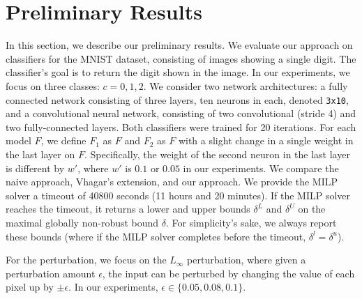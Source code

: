 
\section{Preliminary Results}
In this section, we describe our preliminary results.
We evaluate our approach on classifiers for the MNIST dataset, consisting of images showing a single digit.
The classifier's goal is to return the digit shown in the image. In our experiments, we focus on three classes: $c=0,1,2$.
We consider two network architectures: 
a fully connected network consisting of three layers, ten neurons in each, denoted \texttt{3x10}, and a convolutional neural network, 
consisting of two convolutional (stride 4) and two fully-connected layers. Both classifiers were trained for 20 iterations.
For each model $F$, we define $F_1$ as $F$ and $F_2$ as $F$ with a slight change in a single weight in the last layer on $F$. Specifically, the weight of the second neuron in the last layer is different by $w'$, where $w'$ is $0.1$ or $0.05$ in our experiments.
We compare the naive approach, Vhagar's extension, and our approach.
We provide the MILP solver a timeout of 40800 seconds (11 hours and 20 minutes).
If the MILP solver reaches the timeout, it returns a lower and upper bounds $\delta^L$ and $\delta^U$ on the maximal globally non-robust bound $\delta$. For simplicity's sake, we always report these bounds (where if the MILP solver completes before the timeout, $\delta^l=\delta^u$).
\begin{comment}
\begin{table}[H]
    \centering
    \resizebox{\textwidth}{!}{
    \begin{tabular}{@{\extracolsep{\fill}}llll@{}}
        \toprule
        \makecell{Dataset} & \makecell{Name} & \makecell{Architecture}  & \makecell{Iterations during training} \\
        \midrule            
        \multirow{2}{*}{MNIST} & 3 x 10 & 3 fully-connected layers & 20 \\
                               & CNN & 2 convolutional (stride 4) and 2 fully-connected layers & 20 \\
        \bottomrule
    \end{tabular}
    }
    \caption{The networks used for this experience.
        \label{table_architectures}}
\end{table}
\end{comment}
For the perturbation, we focus on the $L_\infty$ perturbation, where given a perturbation amount $\epsilon$, the input can be perturbed by changing the value of each pixel up by $\pm\epsilon$. In our experiments, $\epsilon\in\{0.05,0.08,0.1\}$.

